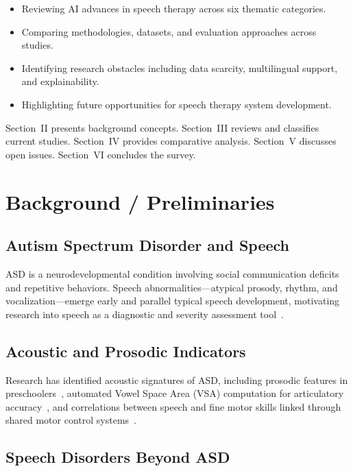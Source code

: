 \documentclass[conference]{IEEEtran}
\begin{document}
\begin{itemize}
    \item Reviewing AI advances in speech therapy across six thematic categories.
    \item Comparing methodologies, datasets, and evaluation approaches across studies.
    \item Identifying research obstacles including data scarcity, multilingual support, and explainability.
    \item Highlighting future opportunities for speech therapy system development.
\end{itemize}

Section~II presents background concepts. Section~III reviews and classifies current studies. Section~IV provides comparative analysis. Section~V discusses open issues. Section~VI concludes the survey.

\section{Background / Preliminaries}
\label{sec:background}

\subsection{Autism Spectrum Disorder and Speech}

ASD is a neurodevelopmental condition involving social communication deficits and repetitive behaviors. Speech abnormalities---atypical prosody, rhythm, and vocalization---emerge early and parallel typical speech development, motivating research into speech as a diagnostic and severity assessment tool~\cite{ref7,ref10}.

\subsection{Acoustic and Prosodic Indicators}

Research has identified acoustic signatures of ASD, including prosodic features in preschoolers~\cite{ref7}, automated Vowel Space Area (VSA) computation for articulatory accuracy~\cite{ref8}, and correlations between speech and fine motor skills linked through shared motor control systems~\cite{ref6}.

\subsection{Speech Disorders Beyond ASD}
\end{document}
